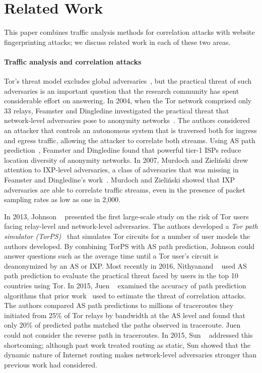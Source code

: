 \section{Related Work}
\label{sec:related_work}

This paper combines traffic analysis methods for correlation attacks
with website fingerprinting attacks; we discuss related work in each of
these two areas.

\paragraph{Traffic analysis and correlation attacks}
Tor's threat model excludes global adversaries~\cite{Dingledine2004a}, but the
practical threat of such adversaries is an important question that the
research community has
spent considerable effort on answering.  In 2004, when the Tor network comprised
only 33 relays, Feamster and Dingledine investigated the practical threat that
network-level adversaries pose to anonymity networks~\cite{Feamster2004a}.
The authors considered an attacker that controls an autonomous
system that is traversed both for ingress and egress traffic, allowing the
attacker to correlate both streams.  Using AS path prediction~\cite{Gao2001a},
Feamster and Dingledine found that powerful tier-1 ISPs reduce location
diversity of anonymity networks.  In 2007, Murdoch and Zieli\'{n}ski drew
attention to IXP-level adversaries, a class of adversaries that was missing in
Feamster and Dingledine's work~\cite{Murdoch2007a}.  Murdoch and Zieli\'{n}ski
showed that IXP adversaries are able to correlate traffic streams, even in the
presence of packet sampling rates as low as one in 2,000.

In 2013, Johnson
\ea~\cite{Johnson2013a} presented the first large-scale study on the risk of Tor
users facing relay-level and network-level adversaries.  The authors developed a
{\em Tor path simulator (TorPS)}~\cite{TorPS} that simulates Tor circuits for a number
of user models the authors developed.  By combining TorPS with AS path
prediction, Johnson \ea could answer questions such as the average time until a
Tor user's circuit is deanonymized by an AS or IXP.  Most recently in 2016,
Nithyanand \ea~\cite{Nithyanand2016a} used AS path prediction to evaluate the
practical threat faced by users in the top 10 countries using Tor.  In 2015,
Juen \ea~\cite{Juen2015a} examined the accuracy of path prediction algorithms
that prior work~\cite{Johnson2013a,Feamster2004a} used to estimate the threat of
correlation attacks.  The authors compared AS path predictions to millions of
traceroutes they initiated from 25\% of Tor relays by bandwidth at the
AS level and found that
only 20\% of predicted paths matched the paths observed in traceroute.
Juen \ea could not consider the reverse path in traceroutes.  In 2015,
Sun \ea~\cite{Sun2015a} addressed this shortcoming; although past work treated
routing as static, Sun \ea showed that the dynamic nature of Internet
routing makes network-level adversaries stronger than previous work had considered.

